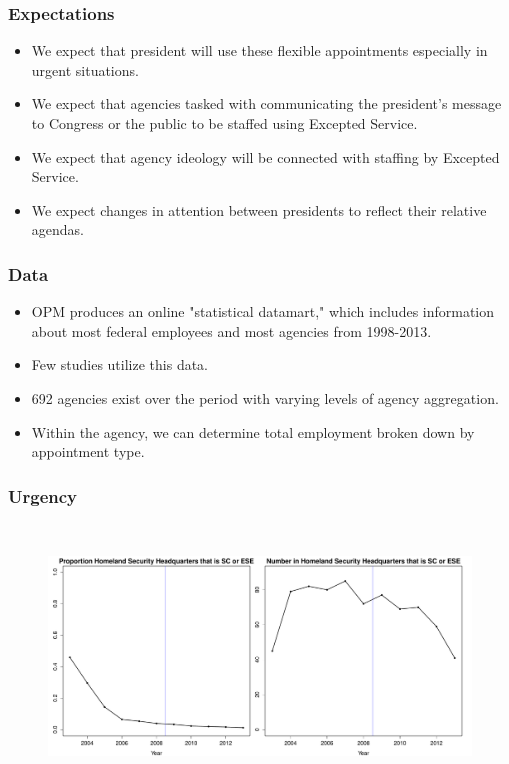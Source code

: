 \documentclass{beamer}
\begin{document}
\begin{frame}
\frametitle{Expectations}

\begin{itemize}\addtolength{\itemsep}{1.5\baselineskip}
\item We expect that president will use these flexible appointments especially in urgent situations. 
\item We expect that agencies tasked with communicating the president's message to Congress or the public to be staffed using Excepted Service.
\item We expect that agency ideology will be connected with staffing by Excepted Service.
\item We expect changes in attention between presidents to reflect their relative agendas. 
\end{itemize}
\end{frame}

\begin{frame}
\frametitle{Data}
\begin{itemize} \addtolength{\itemsep}{1.5\baselineskip}
\item OPM produces an online "statistical datamart," which includes information about most federal employees and most agencies from 1998-2013. 
\item Few studies utilize this data.
\item 692 agencies exist over the period with varying levels of agency aggregation.
\item Within the agency, we can determine total employment broken down by appointment type. 
\end{itemize}
\end{frame}

\begin{frame}
\frametitle{Urgency}
\begin{figure}[htb]
\begin{center}
\includegraphics[height=2.75in,width=4.9in]{DHSProportionRawNumber.pdf}
\end{center}
\end{figure}
\end{frame}
\end{document}
